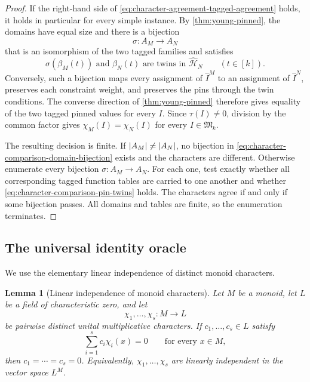 \documentclass[11pt]{article}
\theoremstyle{plain}
\newtheorem{lemma}[lemma]{Lemma}
\theoremstyle{definition}
\theoremstyle{remark}
\newcommand{\InstMonoid}[1]{\mathfrak M_{#1}}
\DeclarePairedDelimiter{\abs}{\lvert}{\rvert}
\begin{document}
\begin{proof}
If the right-hand side of
\eqref{eq:character-agreement-tagged-agreement} holds, it holds in
particular for every simple instance.  By \cref{thm:young-pinned}, the
domains have equal size and there is a bijection
\begin{equation}
  \sigma:A_M\to A_N
  \label{eq:character-comparison-domain-bijection}
\end{equation}
that is an isomorphism of the two tagged families and satisfies
\begin{equation}
  \sigma(\beta_M(t))
  \text{ and }\beta_N(t)
  \text{ are twins in }\widehat{\mathcal H}_N
  \qquad(t\in[k]).
  \label{eq:character-comparison-pin-twins}
\end{equation}
Conversely, such a bijection maps every assignment of
$\widehat I^M$ to an assignment of $\widehat I^N$, preserves each
constraint weight, and preserves the pins through the twin conditions.
The converse direction of \cref{thm:young-pinned} therefore gives equality of
the two tagged pinned values
for every $I$.  Since $\tau(I)\ne0$, division by the common factor gives
$\chi_M(I)=\chi_N(I)$ for every $I\in\InstMonoid{k}$.

The resulting decision is finite.  If $\abs{A_M}\ne\abs{A_N}$, no
bijection in \eqref{eq:character-comparison-domain-bijection} exists and
the characters are different.  Otherwise enumerate every bijection
$\sigma:A_M\to A_N$.  For each one, test exactly whether all corresponding
tagged function tables are carried to one another and whether
\eqref{eq:character-comparison-pin-twins} holds.  The characters agree if
and only if some bijection passes.  All domains and tables are finite, so
the enumeration terminates.
\end{proof}

\subsection{The universal identity oracle}

We use the elementary linear independence of distinct monoid characters.

\begin{lemma}[Linear independence of monoid characters]
\label{lem:dedekind-independence}
Let $M$ be a monoid, let $L$ be a field of characteristic zero, and let
\[
  \chi_1,\ldots,\chi_s:M\to L
\]
be pairwise distinct unital multiplicative characters.  If
$c_1,\ldots,c_s\in L$ satisfy
\begin{equation}
  \sum_{i=1}^s c_i\chi_i(x)=0
  \qquad\text{for every }x\in M,
  \label{eq:dedekind-assumed-relation}
\end{equation}
then $c_1=\cdots=c_s=0$.  Equivalently,
$\chi_1,\ldots,\chi_s$ are linearly independent in the vector space $L^M$.
\end{lemma}
\end{document}
